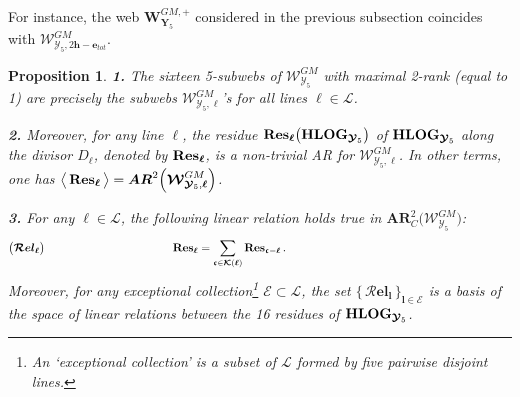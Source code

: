\documentclass[11pt]{amsart}
\newcommand{\sk}{\smallskip}
\newtheorem{prop}[thm]{Proposition}
\begin{document}
For instance, the web 
$\boldsymbol{W}^{GM,+}_{ \boldsymbol{Y}_5}$ considered in the previous subsection coincides with 
${\boldsymbol{\mathcal W}_{\boldsymbol{\mathcal Y}_5, 
2\boldsymbol{h}-\boldsymbol{e}_{tot}}^{GM}}$. 




\begin{prop}%
{\bf 1.}  The sixteen 5-subwebs of ${\boldsymbol{\mathcal W}_{\boldsymbol{\mathcal Y}_5}^{GM}}$ with maximal 2-rank (equal to 1) are precisely the subwebs 
${\boldsymbol{\mathcal W}_{\boldsymbol{\mathcal Y}_5, \boldsymbol{\ell}}^{GM}}$'s for all 
lines $\boldsymbol{\ell}\in \boldsymbol{\mathcal L}$. \sk

\noindent 
{\bf 2.}  Moreover, for any line $\boldsymbol{\ell}$, the residue 
$ {\bf Res}_{{\boldsymbol{\ell}}} \big( 
{\bf HLOG}_{\boldsymbol{\mathcal Y}_5}
\big)$
of ${\bf HLOG}_{\boldsymbol{\mathcal Y}_5}$ along the divisor $D_{\boldsymbol{\ell}}$, 
denoted by ${\bf Res}_{\boldsymbol{\ell}}$,  
is a non-trivial AR for  ${\boldsymbol{\mathcal W}_{\boldsymbol{\mathcal Y}_5, \boldsymbol{\ell}}^{GM}}$. In other terms,  
one has 
$
\big\langle \, 
{\bf Res}_{\boldsymbol{\ell}}
\,  \big\rangle =\boldsymbol{AR}^2\Big( {\boldsymbol{\mathcal W}_{\boldsymbol{\mathcal Y}_5, \boldsymbol{\ell}}^{GM}} \Big) $. 
\sk

\noindent 
{\bf 3.}  For any $\boldsymbol{\ell}\in \boldsymbol{\mathcal L}$, the following linear  relation holds true in $\boldsymbol{AR}^2_C\big( {\boldsymbol{\mathcal W}_{\boldsymbol{\mathcal Y}_5}^{GM}} \big) $: 
\begin{equation*}
\boldsymbol{\big( {\mathcal R}{el}_{\ell}\big)} \hspace{4cm}  
{\bf Res}_{\boldsymbol{\ell}}=\sum_{
\boldsymbol{\mathfrak c}
\in \boldsymbol{\mathcal K}(\boldsymbol{\ell})
 } {\bf Res}_{\boldsymbol{\mathfrak c}-\boldsymbol{\ell}}\, . 
 \hspace{7cm}{}^{} 
\end{equation*}
Moreover, for any exceptional collection\footnote{An {\it `exceptional collection'} is a subset of 
$\boldsymbol{\mathcal L}$ formed by five pairwise disjoint lines.} $\boldsymbol{\mathcal E}\subset 
\boldsymbol{\mathcal L}$, 
the set $\big\{ \, 
\boldsymbol{ {\mathcal R}{el}_{\boldsymbol{l}}}
\,  \big\}_{ \boldsymbol{l} \in \boldsymbol{\mathcal E}}$ is a basis of the space of linear relations between the 16 residues of 
${\bf HLOG}_{\boldsymbol{\mathcal Y}_5}$. 
\sk


\end{prop}
\end{document}
